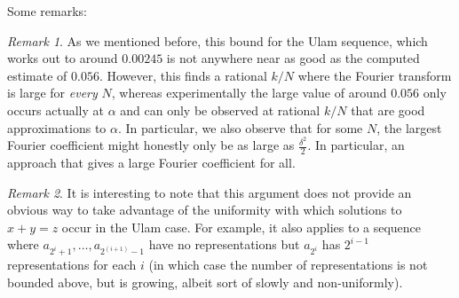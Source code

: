 \documentclass{article}
\theoremstyle{definition}
\theoremstyle{remark}
\newtheorem{remark}{Remark}
\numberwithin{equation}{section}
\begin{document}
Some remarks: 

\begin{remark}
  As we mentioned before, this bound for the Ulam sequence, which
  works out to around $0.00245$ is not anywhere near as good as the
  computed estimate of $0.056$.  However, this finds a rational $k/N$
  where the Fourier transform is large for \textit{every} $N$, whereas
  experimentally the large value of around $0.056$ only occurs
  actually at $\alpha$ and can only be observed at rational $k/N$ that
  are good approximations to $\alpha$.  In particular, we also observe
  that for some $N$, the largest Fourier coefficient might honestly
  only be as large as $\frac{\delta^2}{2}$.  In particular, an
  approach that gives a large Fourier coefficient for all.
\end{remark}


\begin{remark}
  It is interesting to note that this argument does not provide an
  obvious way to take advantage of the uniformity with which solutions
  to $x+y=z$ occur in the Ulam case.  For example, it also applies to
  a sequence where $a_{2^i+1}, \ldots, a_{2^(i+1)-1}$ have no
  representations but $a_{2^i}$ has $2^{i-1}$ representations for each
  $i$ (in which case the number of representations is not bounded
  above, but is growing, albeit sort of slowly and non-uniformly).
\end{remark}
\end{document}
